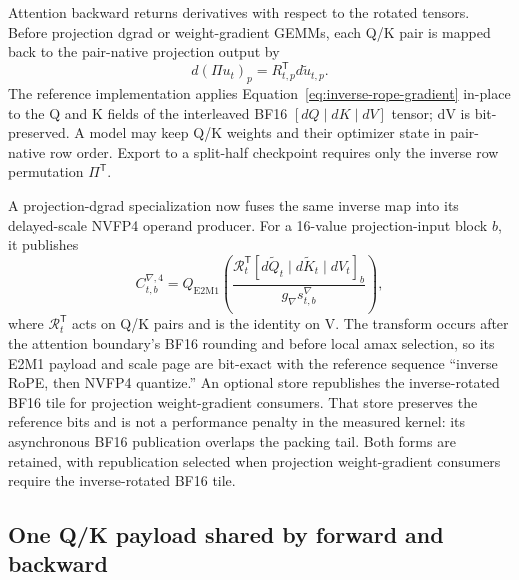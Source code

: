 Attention backward returns derivatives with respect to the rotated tensors.
Before projection dgrad or weight-gradient GEMMs, each Q/K pair is mapped
back to the pair-native projection output by
\begin{equation}
  d(\Pi u_t)_p=R_{t,p}^{\mathsf T}d\widetilde u_{t,p}.
  \label{eq:inverse-rope-gradient}
\end{equation}
The reference implementation applies Equation~\ref{eq:inverse-rope-gradient}
in-place to the Q and K fields of the interleaved BF16
$[dQ\mid dK\mid dV]$ tensor; dV is bit-preserved.  A model may keep Q/K
weights and their optimizer state in pair-native row order.  Export to a
split-half checkpoint requires only the inverse row permutation $\Pi^{\mathsf
T}$.

A projection-dgrad specialization now fuses the same inverse map into its
delayed-scale NVFP4 operand producer.  For a 16-value projection-input block
$b$, it publishes
\begin{equation}
  C^{\nabla,4}_{t,b}
  =Q_{\mathrm{E2M1}}\!\left(
    \frac{\mathcal R_t^{\mathsf T}
      [d\widetilde Q_t\mid d\widetilde K_t\mid dV_t]_b}
         {g_\nabla s^\nabla_{t,b}}
  \right),
  \label{eq:inverse-rope-gradient-nvfp4-handoff}
\end{equation}
where $\mathcal R_t^{\mathsf T}$ acts on Q/K pairs and is the identity on V.
The transform occurs after the attention boundary's BF16 rounding and before
local amax selection, so its E2M1 payload and scale page are bit-exact with
the reference sequence ``inverse RoPE, then NVFP4 quantize.''  An optional
store republishes the inverse-rotated BF16 tile for projection weight-gradient
consumers.  That store preserves the reference bits and is not a performance
penalty in the measured kernel: its asynchronous BF16 publication overlaps
the packing tail.  Both forms are retained, with republication selected when
projection weight-gradient consumers require the inverse-rotated BF16 tile.

\subsection{One Q/K payload shared by forward and backward}

